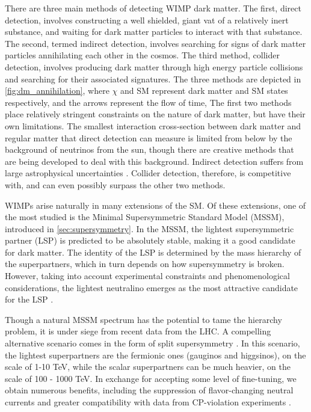 There are three main methods of detecting WIMP dark matter. The first, direct detection, involves constructing a well shielded, giant vat of a relatively inert substance, and waiting for dark matter particles to interact with that substance. The second, termed indirect detection, involves searching for signs of dark matter particles annihilating each other in the cosmos. The third method, collider detection, involves producing dark matter through high energy particle collisions and searching for their associated signatures. The three methods are depicted in \autoref{fig:dm_annihilation}, where $\chi$ and SM represent dark matter and SM states respectively, and the arrows represent the flow of time, The first two methods place relatively stringent constraints on the nature of dark matter, but have their own limitations. The smallest interaction cross-section between dark matter and regular matter that direct detection can measure is limited from below by the background of neutrinos from the sun, though there are creative methods that are being developed to deal with this background. Indirect detection suffers from large astrophysical uncertainties \cite{Low2014}. Collider detection, therefore, is competitive with, and can even possibly surpass the other two methods.

\newcommand{\cb}{ c_\beta}
\newcommand{\cw}{ c_W}
\newcommand{\sinb}{ s_\beta}
\newcommand{\sw}{ s_W}
\newcommand{\mz}{ m_Z}

WIMPs arise naturally in many extensions of the SM. Of these extensions, one of the most studied is the Minimal Supersymmetric Standard Model (MSSM), introduced in \autoref{sec:supersymmetry}. In the MSSM, the lightest supersymmetric partner (LSP) is predicted to be absolutely stable, making it a good candidate for dark matter. The identity of the LSP is determined by the mass hierarchy of the superpartners, which in turn depends on how supersymmetry is broken. However, taking into account experimental constraints and phenomenological considerations, the lightest neutralino emerges as the most attractive candidate for the LSP \citep{Bertone2005a}. 

Though a natural MSSM spectrum has the potential to tame the hierarchy problem, it is under siege from recent data from the LHC. A compelling alternative scenario comes in the form of split supersymmetry  \citep{Wells:2003tf, Dimopoulos2004, Giudice2005}. In this scenario, the lightest superpartners are the fermionic ones (gauginos and higgsinos), on the scale of 1-10 TeV, while the scalar superpartners can be much heavier, on the scale of 100 - 1000 TeV. In exchange for accepting some level of fine-tuning, we obtain numerous benefits, including the suppression of flavor-changing neutral currents and greater compatibility with data from CP-violation experiments \cite{Wells:2003tf}.

